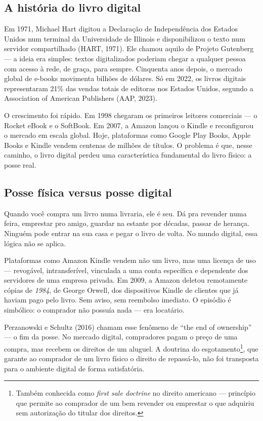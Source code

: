 \documentclass[12pt]{article}
\begin{document}
\subsection*{A história do livro digital}

Em 1971, Michael Hart digitou a Declaração de Independência dos Estados Unidos num terminal da Universidade de Illinois e disponibilizou o texto num servidor compartilhado (HART, 1971). Ele chamou aquilo de Projeto Gutenberg — a ideia era simples: textos digitalizados poderiam chegar a qualquer pessoa com acesso à rede, de graça, para sempre. Cinquenta anos depois, o mercado global de e-books movimenta bilhões de dólares. Só em 2022, os livros digitais representaram 21\% das vendas totais de editoras nos Estados Unidos, segundo a Association of American Publishers (AAP, 2023).

O crescimento foi rápido. Em 1998 chegaram os primeiros leitores comerciais — o Rocket eBook e o SoftBook. Em 2007, a Amazon lançou o Kindle e reconfigurou o mercado em escala global. Hoje, plataformas como Google Play Books, Apple Books e Kindle vendem centenas de milhões de títulos. O problema é que, nesse caminho, o livro digital perdeu uma característica fundamental do livro físico: a posse real.

\subsection*{Posse física versus posse digital}

Quando você compra um livro numa livraria, ele é seu. Dá pra revender numa feira, emprestar pro amigo, guardar na estante por décadas, passar de herança. Ninguém pode entrar na sua casa e pegar o livro de volta. No mundo digital, essa lógica não se aplica.

Plataformas como Amazon Kindle vendem não um livro, mas uma licença de uso — revogável, intransferível, vinculada a uma conta específica e dependente dos servidores de uma empresa privada. Em 2009, a Amazon deletou remotamente cópias de \textit{1984}, de George Orwell, dos dispositivos Kindle de clientes que já haviam pago pelo livro. Sem aviso, sem reembolso imediato. O episódio é simbólico: o comprador não possuía nada — era locatário.

Perzanowski e Schultz (2016) chamam esse fenômeno de ``the end of ownership'' — o fim da posse. No mercado digital, compradores pagam o preço de uma compra, mas recebem os direitos de um aluguel. A doutrina do esgotamento\footnote{Também conhecida como \textit{first sale doctrine} no direito americano — princípio que permite ao comprador de um bem revender ou emprestar o que adquiriu sem autorização do titular dos direitos.}, que garante ao comprador de um livro físico o direito de repassá-lo, não foi transposta para o ambiente digital de forma satisfatória.
\end{document}

